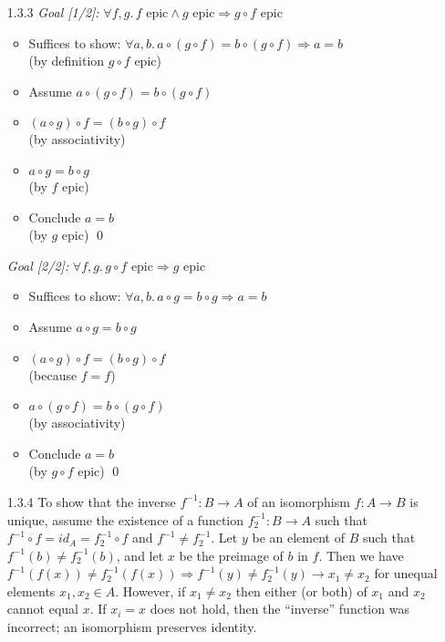 \documentclass{article}
\begin{document}
\begin{enumerate}
\item[]
\item[1.3.3]
  \emph{Goal [1/2]:} $\forall f, g .\,f \mbox{ epic} \wedge g \mbox{ epic} \Rightarrow g \circ f \mbox{ epic}$
  \begin{itemize}
  \item
    Suffices to show: $\forall a, b .\,a \circ (g \circ f) = b \circ (g \circ f) \Rightarrow a = b$
    \\ (by definition $g \circ f$ epic)
  \item
    Assume $a \circ (g \circ f) = b \circ (g \circ f)$
  \item
    $(a \circ g) \circ f = (b \circ g) \circ f$
    \\ (by associativity)
  \item
    $a \circ g = b \circ g$
    \\ (by $f$ epic)
  \item
    Conclude $a = b$
    \\ (by $g$ epic) \qed
  \end{itemize}

\item[]
  \emph{Goal [2/2]:} $\forall f,g .\,g \circ f \mbox{ epic} \Rightarrow g \mbox{ epic}$
  \begin{itemize}
  \item
    Suffices to show: $\forall a, b .\,a \circ g = b \circ g \Rightarrow a = b$
  \item
    Assume $a \circ g = b \circ g$
  \item
    $(a \circ g) \circ f = (b \circ g) \circ f$
    \\ (because $f = f$)
  \item
    $a \circ (g \circ f) = b \circ (g \circ f)$
    \\ (by associativity)
  \item
    Conclude $a = b$
      \\ (by $g \circ f$ epic) \qed
  \end{itemize}

\item[]
\item[1.3.4]
  To show that the inverse $f^{-1} : B \rightarrow A$ of an isomorphism $f : A\rightarrow B$ is unique, assume the existence of a function $f^{-1}_2 : B \rightarrow A$ such that $f^{-1} \circ f = id_A = f^{-1}_2 \circ f$ and $f^{-1} \ne f^{-1}_2$.
  Let $y$ be an element of $B$ such that $f^{-1}(b) \ne f^{-1}_2(b)$, and let $x$ be the preimage of $b$ in $f$.
  Then we have $f^{-1}(f(x)) \ne f^{-1}_2(f(x)) \Rightarrow f^{-1}(y) \ne f^{-1}_2(y) \rightarrow x_1 \ne x_2$ for unequal elements $x_1,x_2 \in A$.
  However, if $x_1 \ne x_2$ then either (or both) of $x_1$ and $x_2$ cannot equal $x$.
  If $x_i = x$ does not hold, then the ``inverse'' function was incorrect; an isomorphism preserves identity.


\end{enumerate}
\end{document}
